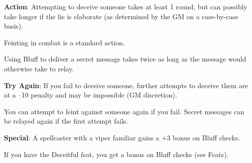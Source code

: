 \textbf{Action}: Attempting to deceive someone takes at least 1 round, but can possibly take longer if the lie is elaborate (as determined by the GM on a case-by-case basis).
				
Feinting in combat is a standard action.
				
Using Bluff to deliver a secret message takes twice as long as the message would otherwise take to relay.
				
\textbf{Try Again}: If you fail to deceive someone, further attempts to deceive them are at a --10 penalty and may be impossible (GM discretion).
				
You can attempt to feint against someone again if you fail. Secret messages can be relayed again if the first attempt fails.
				
\textbf{Special}: A spellcaster with a viper familiar gains a +3 bonus on Bluff checks.
				
If you have the Deceitful feat, you get a bonus on Bluff checks (see Feats).
        	

